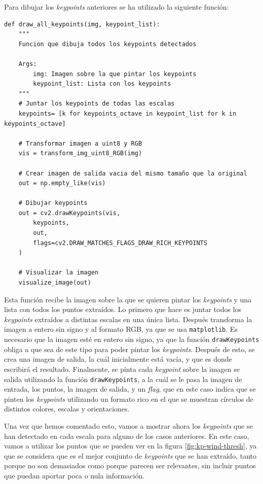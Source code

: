 \documentclass[11pt,a4paper]{article}
\begin{document}
Para dibujar los \textit{keypoints} anteriores se ha utilizado la siguiente función:

\begin{lstlisting}
def draw_all_keypoints(img, keypoint_list):
    """
    Funcion que dibuja todos los keypoints detectados

    Args:
        img: Imagen sobre la que pintar los keypoints
        keypoint_list: Lista con los keypoints
    """
    # Juntar los keypoints de todas las escalas
    keypoints= [k for keypoints_octave in keypoint_list for k in keypoints_octave]

    # Transformar imagen a uint8 y RGB
    vis = transform_img_uint8_RGB(img)

    # Crear imagen de salida vacia del mismo tamaño que la original
    out = np.empty_like(vis)

    # Dibujar keypoints
    out = cv2.drawKeypoints(vis,
        keypoints,
        out,
        flags=cv2.DRAW_MATCHES_FLAGS_DRAW_RICH_KEYPOINTS
    )

    # Visualizar la imagen
    visualize_image(out)
\end{lstlisting}

Esta función recibe la imagen sobre la que se quieren pintar los \textit{keypoints} y
una lista con todos los puntos extraídos. Lo primero que hace es juntar todos los
\textit{keypoints} extraídos a distintas escalas en una única lista. Después 
transforma la imagen a entero sin signo y al formato RGB, ya que se usa \texttt{matplotlib}. Es necesario que la
imagen esté en entero sin signo, ya que la función \texttt{drawKeypoints} obliga
a que sea de este tipo para poder pintar los \textit{keypoints}. Después
de esto, se crea una imagen de salida, la cuál inicialmente está vacía, y que es
donde escribirá el resultado. Finalmente, se pinta cada \textit{keypoint} sobre
la imagen se salida utilizando la función  \texttt{drawKeypoints}, a la cuál
se le pasa la imagen de entrada, los puntos, la imagen de salida, y un \textit{flag},
que en este caso indica que se pinten los \textit{keypoints} utilizando un formato
rico en el que se muestran círculos de distintos colores, escalas y orientaciones.

Una vez que hemos comentado esto, vamos a mostrar ahora los \textit{keypoints} que
se han detectado en cada escala para alguno de los casos anteriores. En este caso,
vamos a utilizar los puntos que se pueden ver en la figura \ref{fig:kp-wind-thresh}, ya
que se considera que es el mejor conjunto de \textit{keypoints} que se han extraído,
tanto porque no son demasiados como porque parecen ser relevantes, sin incluir
puntos que puedan aportar poca o nula información.
\end{document}

